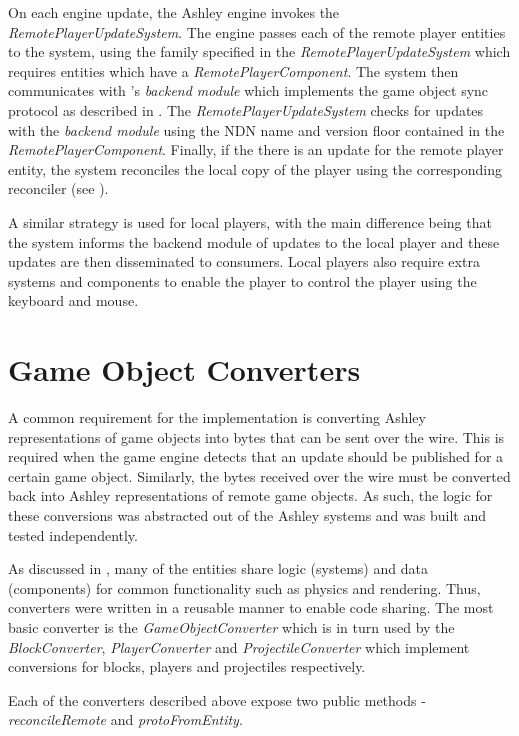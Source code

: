 On each engine update, the Ashley engine invokes the \textit{RemotePlayerUpdateSystem}. The engine passes each of the remote player entities to the system, using the family specified in the \textit{RemotePlayerUpdateSystem} which requires entities which have a \textit{RemotePlayerComponent}. The system then communicates with \game{}'s \textit{backend module} which implements the game object sync protocol as described in . The \textit{RemotePlayerUpdateSystem} checks for updates with the \textit{backend module} using the NDN name and version floor contained in the \textit{RemotePlayerComponent}. Finally, if the there is an update for the remote player entity, the system reconciles the local copy of the player using the corresponding reconciler (see ).

A similar strategy is used for local players, with the main difference being that the system informs the backend module of updates to the local player and these updates are then disseminated to consumers. Local players also require extra systems and components to enable the player to control the player using the keyboard and mouse.

\section{Game Object Converters}\label{sec:impl:converters}
A common requirement for the implementation is converting Ashley representations of game objects into bytes that can be sent over the wire. This is required when the game engine detects that an update should be published for a certain game object. Similarly, the bytes received over the wire must be converted back into Ashley representations of remote game objects. As such, the logic for these conversions was abstracted out of the Ashley systems and was built and tested independently.

As discussed in , many of the entities share logic (systems) and data (components) for common functionality such as physics and rendering. Thus, converters were written in a reusable manner to enable code sharing. The most basic converter is the \textit{GameObjectConverter} which is in turn used by the \textit{BlockConverter}, \textit{PlayerConverter} and \textit{ProjectileConverter} which implement conversions for blocks, players and projectiles respectively. 

Each of the converters described above expose two public methods - \textit{reconcileRemote} and \textit{protoFromEntity}.

